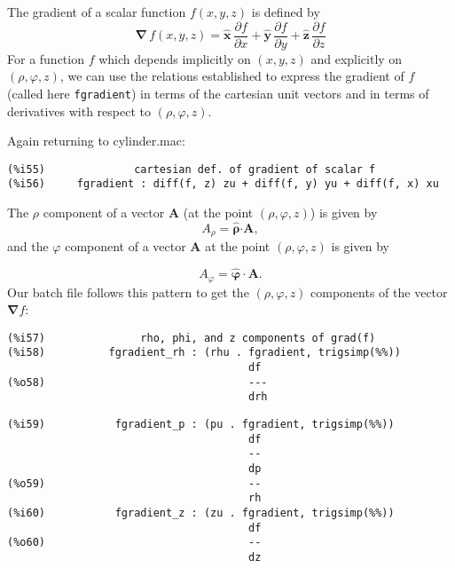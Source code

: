 \documentclass[12pt]{article}
\begin{document}
\smallskip

The gradient of a scalar function $f(x,y,z)$ is defined by
\begin{equation}
\boldsymbol{\nabla} \, f(x,y,z) =
           \mathbf{\hat{x}}\,\frac{\partial f}{\partial x} +
          \mathbf{\hat{y}}\,\frac{\partial f}{\partial y} +
		  \mathbf{\hat{z}}\,\frac{\partial f}{\partial z}
\end{equation}  
For a function $f$ which depends implicitly on $(x,y,z)$ and explicitly on $(\rho,\varphi,z)$,
  we can use the relations established to express
  the gradient of $f$ (called here \verb|fgradient|) in terms of the cartesian unit vectors and in
  terms of derivatives with respect to $(\rho,\varphi,z)$.

\smallskip
Again returning to cylinder.mac:  

\small
\begin{verbatim}
(%i55)              cartesian def. of gradient of scalar f 
(%i56)     fgradient : diff(f, z) zu + diff(f, y) yu + diff(f, x) xu
\end{verbatim}
\normalsize


The $\rho$ component of a vector $\mathbf{A}$ (at the point $(\rho,\varphi,z)$) is given
  by 
\begin{equation}
 A_{\rho} = \boldsymbol{\hat{\rho}} \boldsymbol{\cdot} \mathbf{A},
\end{equation}  
and the $\varphi$ component of a vector $\mathbf{A}$ 
  at the point $(\rho,\varphi,z)$ is given by

\begin{equation}
 A_{\varphi} = \boldsymbol{\hat{\varphi}} \, \boldsymbol{\cdot} \, \mathbf{A}.
\end{equation} 
Our batch file follows this pattern to get the $(\rho,\varphi,z)$
  components of the vector $\boldsymbol{\nabla}f$:

\small
\begin{verbatim}
(%i57)               rho, phi, and z components of grad(f) 
(%i58)          fgradient_rh : (rhu . fgradient, trigsimp(%%))
                                      df
(%o58)                                ---
                                      drh
\end{verbatim}
\newpage
\begin{verbatim}
(%i59)           fgradient_p : (pu . fgradient, trigsimp(%%))
                                      df
                                      --
                                      dp
(%o59)                                --
                                      rh
(%i60)           fgradient_z : (zu . fgradient, trigsimp(%%))
                                      df
(%o60)                                --
                                      dz
\end{verbatim}
\normalsize
\end{document}
